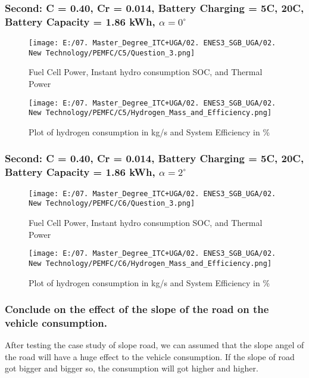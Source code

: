 \documentclass[12pt,a4paper]{article}
\numberwithin{equation}{section}
\begin{document}
\subsubsection{Second: C = 0.40, Cr = 0.014, Battery Charging = 5C, 20C, Battery Capacity = 1.86 kWh, $\alpha = 0^{\circ}$}
\begin{figure}[htbp]
	\centering 
	\texttt{[image: E:/07. Master\_Degree\_ITC+UGA/02. ENES3\_SGB\_UGA/02. New Technology/PEMFC/C5/Question\_3.png]}
	\caption{\small {Fuel Cell Power, Instant hydro consumption SOC, and Thermal Power}}
	\label{29}
\end{figure}
\newpage
\begin{figure}[htbp]
	\centering 
	\texttt{[image: E:/07. Master\_Degree\_ITC+UGA/02. ENES3\_SGB\_UGA/02. New Technology/PEMFC/C5/Hydrogen\_Mass\_and\_Efficiency.png]}
	\caption{\small {Plot of hydrogen consumption in kg/s and System Efficiency in \%}}
	\label{30}
\end{figure}

\subsubsection{Second: C = 0.40, Cr = 0.014, Battery Charging = 5C, 20C, Battery Capacity = 1.86 kWh, $\alpha = 2^{\circ}$}
\begin{figure}[htbp]
	\centering 
	\texttt{[image: E:/07. Master\_Degree\_ITC+UGA/02. ENES3\_SGB\_UGA/02. New Technology/PEMFC/C6/Question\_3.png]}
	\caption{\small {Fuel Cell Power, Instant hydro consumption SOC, and Thermal Power}}
	\label{31}
\end{figure}
\newpage
\begin{figure}[htbp]
	\centering 
	\texttt{[image: E:/07. Master\_Degree\_ITC+UGA/02. ENES3\_SGB\_UGA/02. New Technology/PEMFC/C6/Hydrogen\_Mass\_and\_Efficiency.png]}
	\caption{\small {Plot of hydrogen consumption in kg/s and System Efficiency in \%}}
	\label{32}
\end{figure}


\subsubsection{Conclude on the effect of the slope of the road on the vehicle consumption.}

After testing the case study of slope road, we can assumed that the slope angel of the road will have a huge effect to the vehicle consumption. If the slope of road got bigger and bigger so, the consumption will got higher and higher.
\end{document}
